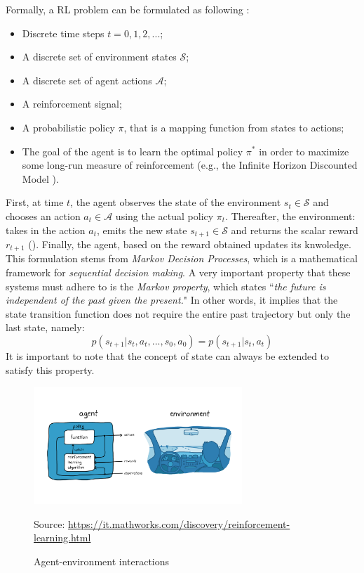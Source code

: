 \documentclass[12pt,a4paper,openright,twoside]{book}
\newcommand{\fonte}[1]{{\color{gray} \small \hypersetup{citecolor=gray} Source: #1}}
\begin{document}
Formally, a RL problem can be formulated as following \cite{RLSurvey}:
    \begin{itemize}
        \item Discrete time steps $t=0, 1, 2, ...$;
        \item A discrete set of environment states $\mathcal{S}$;
        \item A discrete set of agent actions $\mathcal{A}$;
        \item A reinforcement signal;
        \item A probabilistic policy $\pi$, that is a mapping function from states to actions;
        \item The goal of the agent is to learn the optimal policy $\pi^*$ in order to maximize 
                some long-run measure of reinforcement (e.g., the Infinite Horizon Discounted Model \cite{RLSurvey}).
    \end{itemize}
    First, at time $t$, the agent observes the state of the environment $s_t \in \mathcal{S}$
        and chooses an action $a_t \in \mathcal{A}$ using the actual policy $\pi_t$. 
        Thereafter, the environment: takes in the action $a_t$, emits the new state $s_{t+1} \in \mathcal{S}$ 
        and returns the scalar reward $r_{t+1}$ ().
        Finally, the agent, based on the reward obtained updates its knwoledge.
    This formulation stems from \emph{Markov Decision Processes}, which is a mathematical framework for \emph{sequential decision making}. A very important property that these systems must adhere to is the \emph{Markov property}, which states ``\emph{the future is independent of the past given the present.}" In other words, it implies that the state transition function does not require the entire past trajectory but only the last state, namely: 
    $$p(s_{t+1} | s_t, a_t, ..., s_0, a_0) = p(s_{t+1} | s_t, a_t)$$
    It is important to note that the concept of state can always be extended to satisfy this property.


\begin{figure}[t]
    \centering
    \includegraphics[width=0.7\textwidth]{figures/rl.png}
    \caption{Agent-environment interactions}
    \fonte{\url{https://it.mathworks.com/discovery/reinforcement-learning.html}}
    \label{fig:rl_schema}
\end{figure}
\end{document}
